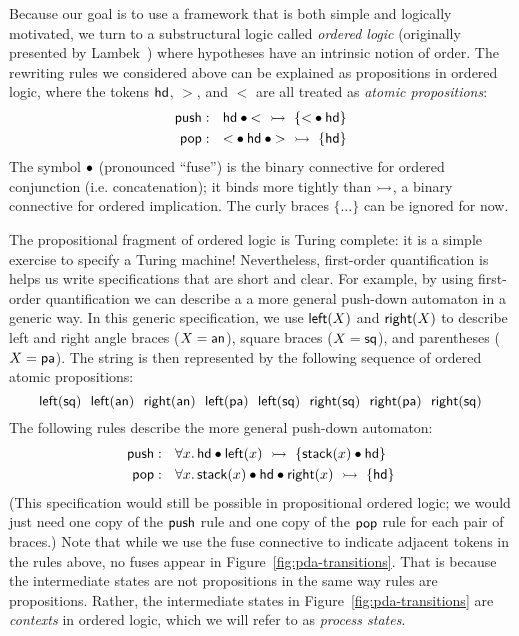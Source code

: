 Because our goal is to use a framework that is both simple and
logically motivated, we turn to a substructural logic called {\it
  ordered logic} (originally presented by
Lambek~\cite{lambek58mathematics}) where hypotheses have an
intrinsic notion of order. The rewriting rules we considered above can
be explained as propositions in ordered logic, where the tokens ${\sf
  hd}$, $>$, and $<$ are all treated as {\it atomic propositions}:
\begin{align*}
{\sf push} &: ~~ {\sf hd} \mathbin{\bullet} {<} ~\rightarrowtail~ \{ {<} \mathbin{\bullet} {\sf hd} \}
\\ 
{\sf pop} &: ~~ {<} \mathbin{\bullet} {\sf hd} \mathbin{\bullet} {>} ~\rightarrowtail~ \{ {\sf hd} \}
\end{align*}
The symbol $\mathbin{\bullet}$ (pronounced ``fuse'') is the binary connective for
ordered conjunction (i.e. concatenation); it binds more tightly than
$\rightarrowtail$, a binary connective for ordered implication. The curly
braces $\{ \ldots \}$ can be ignored for now.

The propositional fragment of ordered logic is
Turing complete: it is a simple exercise to specify a Turing machine!
Nevertheless, first-order quantification is helps us write
specifications that are short and clear. For example, by using
first-order quantification we can describe a 
a more general push-down automaton in a generic way. In
this generic specification, we use ${\sf left}(X)$
and ${\sf right}(X)$ to describe left and right angle braces ($X =
{\sf an}$), square braces ($X = {\sf sq}$), and parentheses ($X = {\sf
  pa}$). The string \obj{\mbox{{\sf [ \textless~\textgreater~( [ ] ) ]}}} 
is then
represented by the following sequence of ordered atomic propositions:
\[
{\sf 
  left(sq) ~~
  left(an) ~~
  right(an) ~~
  left(pa) ~~
  left(sq) ~~
  right(sq) ~~
  right(pa) ~~
  right(sq)
}
\]
The following rules describe the more general push-down automaton:
\begin{align*}
{\sf push} &: ~~ \forall x.\, 
  {\sf hd} \mathbin{\bullet} {\sf left}(x) ~\rightarrowtail~ \{ {\sf stack}(x) \mathbin{\bullet} {\sf hd} \}
\\ 
{\sf pop} &: ~~ \forall x.\, 
  {\sf stack}(x) \mathbin{\bullet} {\sf hd} \mathbin{\bullet} {\sf right}(x) ~\rightarrowtail~ \{ {\sf hd} \}
\end{align*}
(This specification would still be possible in propositional ordered 
logic; we would just need one copy of the ${\sf push}$ rule and one copy
of the ${\sf pop}$ rule for each pair of braces.)
Note that while we use the fuse connective to indicate adjacent tokens
in the rules above, no fuses appear in
Figure~\ref{fig:pda-transitions}. That is because the intermediate
states are not propositions in the same way rules are
propositions. Rather, the intermediate states in
Figure~\ref{fig:pda-transitions} are {\it contexts} in ordered logic,
which we will refer to as {\it process states}. 

